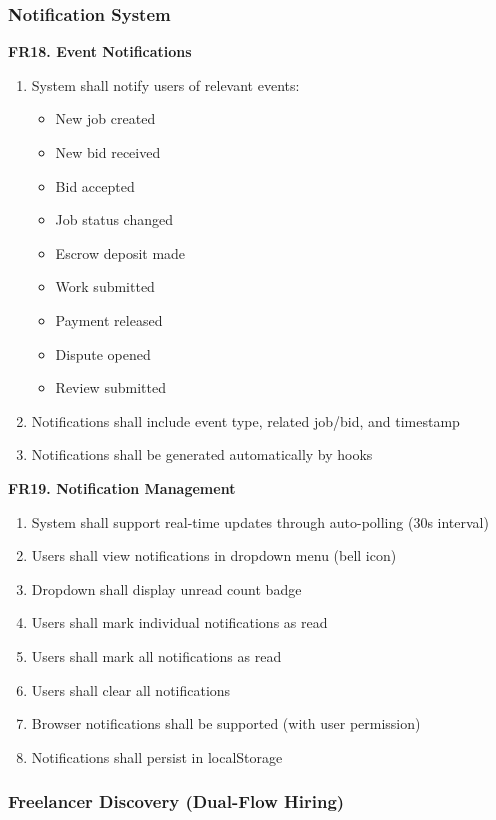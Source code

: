 \documentclass[a4paper,13pt,twoside]{report}
\theoremstyle{definition}
\begin{document}
\subsubsection{Notification System}

\textbf{FR18. Event Notifications}

\begin{enumerate}
    \item System shall notify users of relevant events:
    \begin{itemize}
        \item New job created
        \item New bid received
        \item Bid accepted
        \item Job status changed
        \item Escrow deposit made
        \item Work submitted
        \item Payment released
        \item Dispute opened
        \item Review submitted
    \end{itemize}
    \item Notifications shall include event type, related job/bid, and timestamp
    \item Notifications shall be generated automatically by hooks
\end{enumerate}

\textbf{FR19. Notification Management}

\begin{enumerate}
    \item System shall support real-time updates through auto-polling (30s interval)
    \item Users shall view notifications in dropdown menu (bell icon)
    \item Dropdown shall display unread count badge
    \item Users shall mark individual notifications as read
    \item Users shall mark all notifications as read
    \item Users shall clear all notifications
    \item Browser notifications shall be supported (with user permission)
    \item Notifications shall persist in localStorage
\end{enumerate}

\subsubsection{Freelancer Discovery (Dual-Flow Hiring)}
\end{document}
